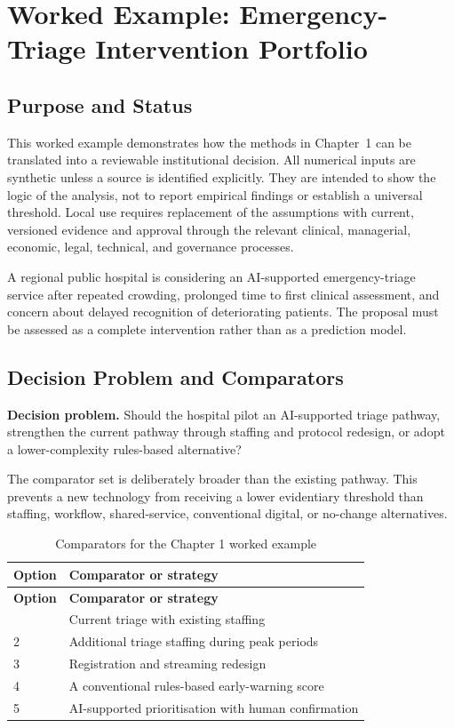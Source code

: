\section{Worked Example: Emergency-Triage Intervention Portfolio}
\label{sec:comp-ch01-worked-example}

\subsection{Purpose and Status}
This worked example demonstrates how the methods in Chapter~1 can be
translated into a reviewable institutional decision. All numerical inputs are
synthetic unless a source is identified explicitly. They are intended to show the
logic of the analysis, not to report empirical findings or establish a universal
threshold. Local use requires replacement of the assumptions with current,
versioned evidence and approval through the relevant clinical, managerial,
economic, legal, technical, and governance processes.

A regional public hospital is considering an AI-supported emergency-triage service after repeated crowding, prolonged time to first clinical assessment, and concern about delayed recognition of deteriorating patients. The proposal must be assessed as a complete intervention rather than as a prediction model. 

\subsection{Decision Problem and Comparators}
\textbf{Decision problem.} Should the hospital pilot an AI-supported triage pathway, strengthen the current pathway through staffing and protocol redesign, or adopt a lower-complexity rules-based alternative?

The comparator set is deliberately broader than the existing pathway. This prevents
a new technology from receiving a lower evidentiary threshold than staffing,
workflow, shared-service, conventional digital, or no-change alternatives.

\begin{longtable}{@{}p{}p{}@{}}
\caption{Comparators for the Chapter 1 worked example}
\label{tab:comp-ch01-comparators}\\
\toprule
\textbf{Option} & \textbf{Comparator or strategy} \\
\midrule
\endfirsthead
\toprule
\textbf{Option} & \textbf{Comparator or strategy} \\
\midrule
\endhead
\bottomrule
\endlastfoot
1 & Current triage with existing staffing \\
2 & Additional triage staffing during peak periods \\
3 & Registration and streaming redesign \\
4 & A conventional rules-based early-warning score \\
5 & AI-supported prioritisation with human confirmation \\
\end{longtable}


